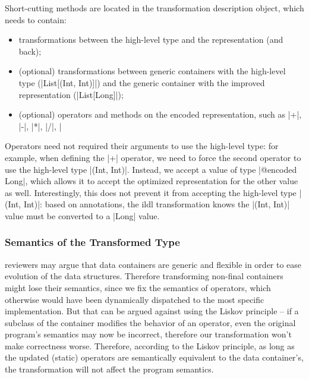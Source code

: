 Short-cutting methods are located in the transformation description object, which needs to contain:
\begin{itemize}
  \item transformations between the high-level type and the representation (and back);
  \item (optional) transformations between generic containers with the high-level type (|List[(Int, Int)]|) and the generic container with the improved representation (|List[Long]|);
  \item (optional) operators and methods on the encoded representation, such as |+|, |-|, |*|, |/|, |%
\end{itemize}

Operators need not required their arguments to use the high-level type: for example, when defining the |+| operator, we need to force the second operator to use the high-level type |(Int, Int)|. Instead, we accept a value of type |@encoded Long|, which allows it to accept the optimized representation for the other value as well. Interestingly, this does not prevent it from accepting the high-level type |(Int, Int)|: based on annotations, the ildl transformation knows the |(Int, Int)| value must be converted to a |Long| value.

\subsubsection{Semantics of the Transformed Type}
reviewers may argue that data containers are generic and flexible in order to ease evolution of the data structures. Therefore transforming non-final containers might lose their semantics, since we fix the semantics of operators, which otherwise would have been dynamically dispatched to the most specific implementation. But that can be argued against using the Liskov principle -- if a subclass of the container modifies the behavior of an operator, even the original program's semantics may now be incorrect, therefore our transformation won't make correctness worse. Therefore, according to the Liskov principle, as long as the updated (static) operators are semantically equivalent to the data container's, the transformation will not affect the program semantics.

